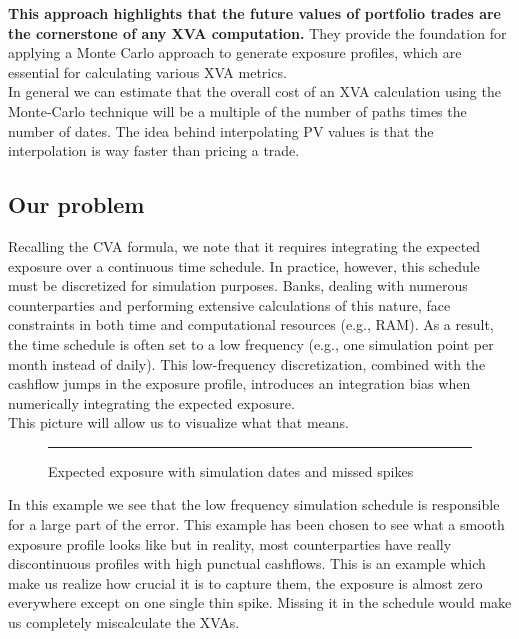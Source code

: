 \documentclass{article}
\begin{document}
\textbf{This approach highlights that the future values of portfolio trades are the cornerstone of any XVA computation.} They provide the foundation for applying a Monte Carlo approach to generate exposure profiles, which are essential for calculating various XVA metrics.\\

In general we can estimate that the overall cost of an XVA calculation using the Monte-Carlo technique will be a multiple of the number of paths times the number of dates. The idea behind interpolating PV values is that the interpolation is way faster than pricing a trade.


\subsection{Our problem}

Recalling the CVA formula, we note that it requires integrating the expected exposure over a continuous time schedule. In practice, however, this schedule must be discretized for simulation purposes. Banks, dealing with numerous counterparties and performing extensive calculations of this nature, face constraints in both time and computational resources (e.g., RAM). As a result, the time schedule is often set to a low frequency (e.g., one simulation point per month instead of daily). This low-frequency discretization, combined with the cashflow jumps in the exposure profile, introduces an integration bias when numerically integrating the expected exposure.\\

This picture will allow us to visualize what that means.

\begin{figure}[H]
    \centering
    \rule{0.8\textwidth}{0.35\textheight} %
    \caption{Expected exposure with simulation dates and missed spikes}
\end{figure}

In this example we see that the low frequency simulation schedule is responsible for a large part of the error. This example has been chosen to see what a smooth exposure profile looks like but in reality, most counterparties have really discontinuous profiles with high punctual cashflows. This is an example which make us realize how crucial it is to capture them, the exposure is almost zero everywhere except on one single thin spike. Missing it in the schedule would make us completely miscalculate the XVAs.
\end{document}
